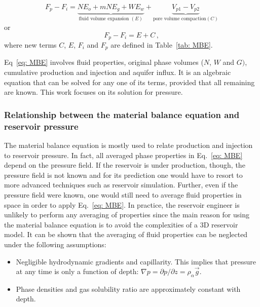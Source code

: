 \documentclass[final,authoryear,5p,twocolumn,10pt]{elsarticle}
\begin{document}
\begin{equation}\label{eq: MBE}
F_p - F_i= \underbrace{N E_o + mN E_g + W E_w}_{\text{fluid volume expansion } (E)} +\underbrace{V_{p1}-V_{p2}}_{\text{pore volume compaction} (C)}
\end{equation}
or
\begin{equation}\label{eq: MBE_short}
F_p - F_i= E + C \, ,
\end{equation}
where new terms $C$, $E$, $F_i$ and $F_p$ are defined in Table~\ref{tab: MBE}. 

Eq~\eqref{eq: MBE} involves fluid properties, original phase volumes ($N$, $W$ and $G)$, cumulative production and injection and aquifer influx.
It is an algebraic equation that can be solved for any one of its terms, provided that all remaining are known. This work focuses on its solution for pressure.

\subsubsection{Relationship between the material balance equation and reservoir pressure}


The material balance equation is mostly used to relate production and injection to reservoir pressure. In fact, all averaged phase properties in Eq.~\eqref{eq: MBE} depend on the pressure field. If the reservoir is under production, though, the pressure field is not known and for its prediction one would have to resort to more advanced techniques such as reservoir simulation. Further, even if the pressure field were known, one would still need to average fluid properties in space in order to apply Eq.~\eqref{eq: MBE}. In practice, the reservoir engineer is unlikely to perform any averaging of properties since the main reason for using the material balance equation is to avoid the complexities of a 3D reservoir model. It can be shown that the averaging of fluid properties can be neglected under the following assumptions:
\begin{itemize}
\item Negligible hydrodynamic gradients and capillarity. This implies that pressure at any time is only a function of depth: $\nabla p = \partial p / \partial z = \rho_\alpha \vec{g}$.
\item Phase densities and gas solubility ratio are approximately constant with depth.
\end{itemize}
\end{document}
